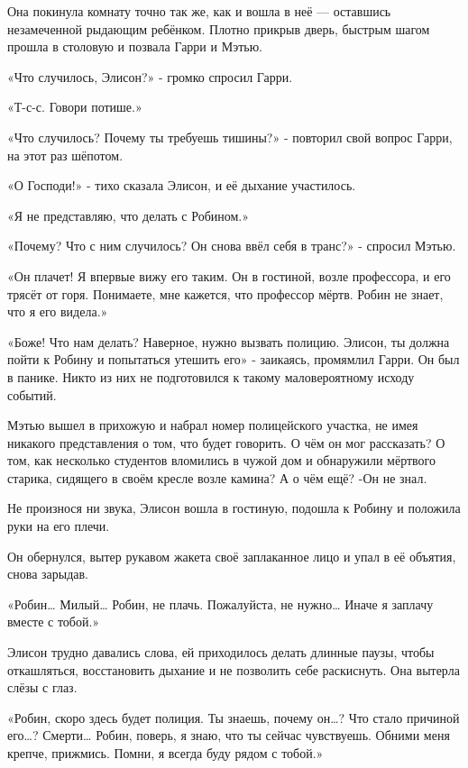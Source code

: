 \documentclass[a4paper,12pt]{book}
\begin{document}
\par
Она покинула комнату точно так же, как и вошла в неё —  оставшись незамеченной рыдающим ребёнком. Плотно прикрыв дверь, быстрым шагом прошла в столовую и позвала Гарри и Мэтью.
\par
«Что случилось, Элисон?» - громко спросил Гарри.
\par
«Т-с-с. Говори потише.»
\par
«Что случилось? Почему ты требуешь тишины?» - повторил свой вопрос Гарри, на этот раз шёпотом.
\par
«О Господи!» - тихо сказала Элисон, и её дыхание участилось.
\par
«Я не представляю, что делать с Робином.»
\par
«Почему? Что с ним случилось? Он снова ввёл себя в транс?» - спросил Мэтью.
\par
«Он плачет! Я впервые вижу его таким. Он в гостиной, возле профессора, и его трясёт от горя. Понимаете, мне кажется, что профессор мёртв. Робин не знает, что я его видела.»
\par
«Боже! Что нам делать? Наверное, нужно вызвать полицию. Элисон, ты должна пойти к Робину и попытаться утешить его» - заикаясь, промямлил Гарри. Он был в панике. Никто из них не подготовился к такому маловероятному исходу событий.
\par
Мэтью вышел в прихожую и набрал номер полицейского участка, не имея никакого представления о том, что будет говорить. О чём он мог рассказать? О том, как несколько студентов вломились в чужой дом и обнаружили мёртвого старика, сидящего в своём кресле возле камина? А о чём ещё? -Он не знал.\\
\par
Не произнося ни звука, Элисон вошла в гостиную, подошла к Робину и положила руки на его плечи.
\par
Он обернулся, вытер рукавом жакета своё заплаканное лицо и упал в её объятия, снова зарыдав.
\par
«Робин… Милый… Робин, не плачь. Пожалуйста, не нужно… Иначе я заплачу вместе с тобой.»
\par
Элисон трудно давались слова, ей приходилось делать длинные паузы, чтобы откашляться, восстановить дыхание и не позволить себе раскиснуть. Она вытерла слёзы с глаз.
\par
«Робин, скоро здесь будет полиция. Ты знаешь, почему он…? Что стало причиной его…? Смерти… Робин, поверь, я знаю, что ты сейчас чувствуешь. Обними меня крепче, прижмись. Помни, я всегда буду рядом с тобой.»
\par
\end{document}
